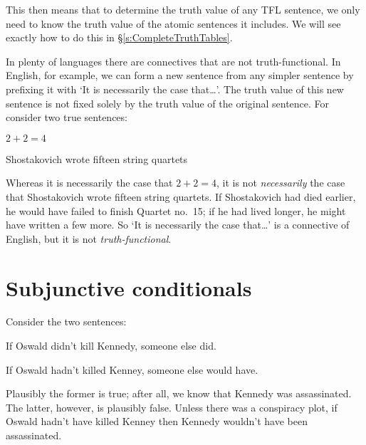 
This then means that to determine the truth value of any TFL sentence, we only need to know the truth value of the atomic sentences it includes. We will see exactly how to do this in \S\ref{s:CompleteTruthTables}.




In plenty of languages there are connectives that are not truth-functional. In English, for example, we can form a new sentence from any simpler sentence by prefixing it with `It is necessarily the case that\ldots'. The truth value of this new sentence is not fixed solely by the truth value of the original sentence. For consider two true sentences:
	\begin{earg}
		\item[\ex{nec-math}] $2 + 2 = 4$
		\item[\ex{nec-music}] Shostakovich wrote fifteen string quartets
	\end{earg}
Whereas it is necessarily the case that $2 + 2 = 4$, it is not \emph{necessarily} the case that Shostakovich wrote fifteen string quartets. If Shostakovich had died earlier, he would have failed to finish Quartet no.\ 15; if he had lived longer, he might have written a few more. So `It is necessarily the case that\ldots' is a connective of English, but it is not \emph{truth-functional}.



\section{Subjunctive conditionals}\label{s:IndicativeSubjunctive}
Consider the two sentences:
\begin{earg}
\item[\ex{indicative}] If Oswald didn't kill Kennedy, someone else did.
\item[\ex{subjunctive}] If Oswald hadn't killed Kenney, someone else would have.
\end{earg}
Plausibly the former is true; after all, we know that Kennedy was assassinated. The latter, however, is plausibly false. Unless there was a conspiracy plot, if Oswald hadn't have killed Kenney then Kennedy wouldn't have been assassinated. 


